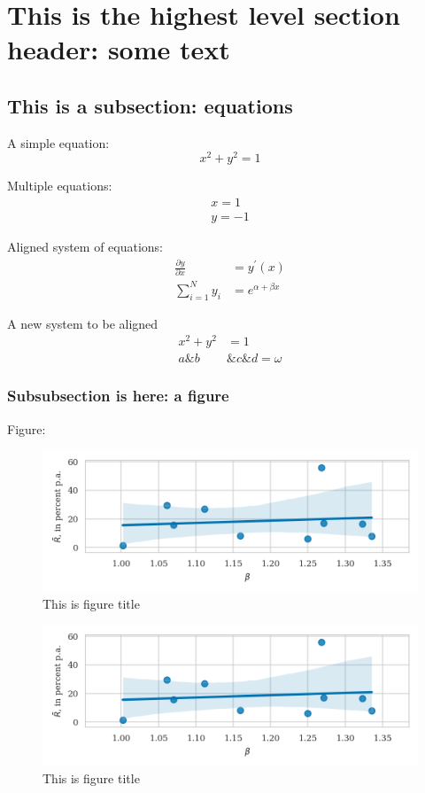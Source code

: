 \documentclass{article}
\begin{document}
\section{This is the highest level section header: some text}
\blindtext[1]

\subsection{This is a subsection: equations}

A simple equation:
\begin{equation}
x^2 + y^2 = 1
\end{equation}


Multiple equations:
\begin{gather}
	x = 1 \\
	y = -1
\end{gather}



Aligned system of equations:
\begin{align}
\frac{\partial y}{\partial x} &= y ^ {\prime} (x) \\
\sum\limits_{i=1}^{N}y_i &= e^{\alpha + \beta x}
\end{align}

A new system to be aligned
\begin{align}
x ^ 2 + y ^ 2 &= 1 \\
a \& b &\& c \& d = \omega
\end{align}

\subsubsection{Subsubsection is here: a figure}
Figure:


\blindtext[2]


\begin{figure}[H]
\caption{This is figure title}
\includegraphics{../../figures/beta-vs-mu.png}
\end{figure}

\blindtext[1]

\begin{figure}[H]
\caption{This is figure title}
\includegraphics{../../figures/beta-vs-mu.png}
\end{figure}
\end{document}
